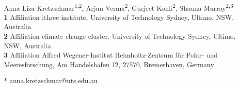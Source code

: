 \documentclass[10pt,letterpaper]{article}
\begin{document}
\vspace*{0.2in}

\begin{flushleft}
{\Large
\textbf{} %
}
\newline
\\
Anna Liza Kretzschmar\textsuperscript{1,2},
Arjun Verma\textsuperscript{2},
Gurjeet Kohli\textsuperscript{2},
Shauna Murray\textsuperscript{2,3}
\\
\bigskip
\textbf{1} Affiliation ithree institute, University of Technology Sydney, Ultimo, NSW, Australia
\\
\textbf{2} Affiliation climate change cluster, University of Technology Sydney, Ultimo, NSW, Australia
\\
\textbf{3} Affiliation Alfred Wegener-Institut Helmholtz-Zentrum für Polar- und Meeresforschung, Am Handelshafen 12, 27570, Bremerhaven, Germany
\bigskip

% 
%





* anna.kretzschmar@uts.edu.au

\end{flushleft}
\end{document}
